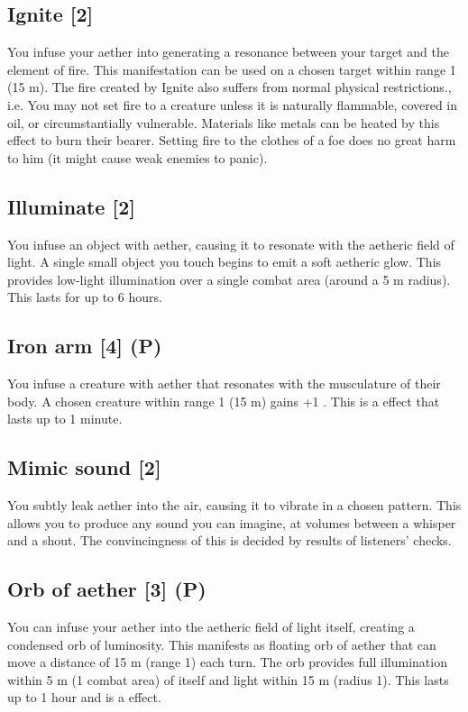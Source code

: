 \documentclass[a4paper,11pt,oneside]{book}
\newcommand{\textlf}[1]{\textbf{\titlecap{#1}}}
\begin{document}
\subsection{Ignite [2]}
\label{spell:ignite}
You infuse your aether into generating a resonance between your target and the element of fire. This manifestation can be used on a chosen target within range 1 (15 m). The fire created by Ignite also suffers from normal physical restrictions., i.e. You may not set fire to a creature unless it is naturally flammable, covered in oil, or circumstantially vulnerable. Materials like metals can be heated by this effect to burn their bearer. Setting fire to the clothes of a foe does no great harm to him (it might cause weak enemies to panic).


\subsection{Illuminate [2]}
\label{spell:illuminate}
You infuse an object with aether, causing it to resonate with the aetheric field of light. A single small object you touch begins to emit a soft aetheric glow. This provides low-light illumination over a single combat area (around a 5 m radius). This lasts for up to 6 hours.


\subsection{Iron arm [4] (P)}
You infuse a creature with aether that resonates with the musculature of their body. A chosen creature within range 1 (15 m) gains +1 \textlf{power}. This is a \textlf{persistent} effect that lasts up to 1 minute.


\subsection{Mimic sound [2]}
You subtly leak aether into the air, causing it to vibrate in a chosen pattern. This allows you to produce any sound you can imagine, at volumes between a whisper and a shout. The convincingness of this is decided by results of listeners' \textlf{resist(W)} checks.


\subsection{Orb of aether [3] (P)}
\label{spell:orb-light}
You can infuse your aether into the aetheric field of light itself, creating a condensed orb of luminosity. This manifests as floating orb of aether that can move a distance of 15 m (range 1) each turn. The orb provides full illumination within 5 m (1 combat area) of itself and \textlf{low} light within 15 m (radius 1). This lasts up to 1 hour and is a \textlf{persistent} effect.
\end{document}
